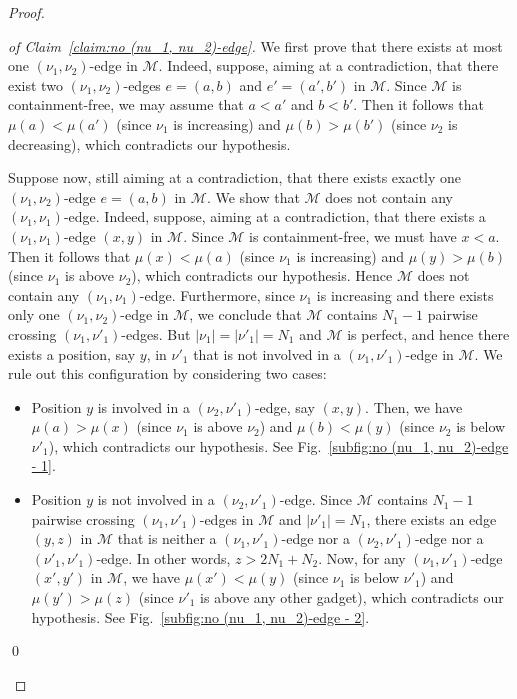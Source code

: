 \documentclass[a4paper,10pt]{llncs}
\begin{document}
\begin{proof}
  \begin{proof}[of Claim~\ref{claim:no (nu_1, nu_2)-edge}]
    We first prove that there exists at most one
    $(\nu_1, \nu_2)$-edge in $\mathcal{M}$.
    Indeed, suppose, aiming at a contradiction, that there exist
    two $(\nu_1, \nu_2)$-edges $e = (a, b)$ and $e' = (a', b')$ in $\mathcal{M}$.
    Since $\mathcal{M}$ is containment-free,
    we may assume that $a < a'$ and $b < b'$.
    Then it follows that $\mu(a) < \mu(a')$
    (since $\nu_1$ is increasing) and $\mu(b) > \mu(b')$
    (since $\nu_2$ is decreasing),
    which contradicts our hypothesis.

    Suppose now, still aiming at a contradiction, that there exists
    exactly one $(\nu_1, \nu_2)$-edge $e = (a, b)$ in $\mathcal{M}$.
    We show that $\mathcal{M}$ does not contain any $(\nu_1, \nu_1)$-edge.
    Indeed, suppose, aiming at a contradiction,
    that there exists a $(\nu_1, \nu_1)$-edge $(x, y)$ in $\mathcal{M}$.
    Since $\mathcal{M}$ is containment-free,
    we must have $x < a$.
    Then it follows that $\mu(x) < \mu(a)$ (since $\nu_1$ is increasing) and
    $\mu(y) > \mu(b)$ (since $\nu_1$ is above $\nu_2$),
    which contradicts our hypothesis.
    Hence $\mathcal{M}$ does not contain any $(\nu_1, \nu_1)$-edge.
    Furthermore, since $\nu_1$ is increasing and
    there exists only one $(\nu_1, \nu_2)$-edge in $\mathcal{M}$,
    we conclude that
    $\mathcal{M}$ contains $N_1-1$ pairwise crossing $(\nu_1, \nu'_1)$-edges.
    But $|\nu_1| = |\nu'_1| = N_1$ and $\mathcal{M}$ is perfect,
    and hence there exists a position, say $y$, in $\nu'_1$ that is
    not involved in a $(\nu_1, \nu'_1)$-edge in $\mathcal{M}$.
    We rule out this configuration by considering two cases:
    \begin{itemize}
      \item Position $y$ is involved in a $(\nu_2, \nu'_1)$-edge,
      say $(x, y)$. Then, we have $\mu(a) > \mu(x)$ (since $\nu_1$ is above $\nu_2$)
      and $\mu(b) < \mu(y)$ (since $\nu_2$ is below $\nu'_1$),
      which contradicts our hypothesis.
      See Fig.~\ref{subfig:no (nu_1, nu_2)-edge - 1}.
      \item Position $y$ is not involved in a $(\nu_2, \nu'_1)$-edge.
      Since $\mathcal{M}$ contains $N_1-1$ pairwise crossing $(\nu_1, \nu'_1)$-edges
      in $\mathcal{M}$ and $|\nu'_1| = N_1$, there exists an edge $(y, z)$ in $\mathcal{M}$
      that is neither a $(\nu_1, \nu'_1)$-edge nor a $(\nu_2, \nu'_1)$-edge
      nor a $(\nu'_1, \nu'_1)$-edge.
      In other words, $z > 2N_1 + N_2$.
      Now, for any $(\nu_1, \nu'_1)$-edge $(x', y')$ in $\mathcal{M}$, we
      have $\mu(x') < \mu(y)$ (since $\nu_1$ is below $\nu'_1$)
      and $\mu(y') > \mu(z)$ (since $\nu'_1$ is above any other gadget),
      which contradicts our hypothesis.
      See Fig.~\ref{subfig:no (nu_1, nu_2)-edge - 2}.
    \end{itemize}
    \qed
  \end{proof}




\end{proof}
\end{document}
